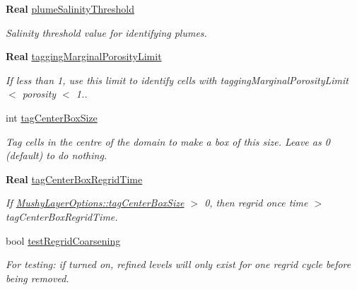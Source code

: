 \begin{DoxyCompactItemize}
\textbf{ Real} \hyperlink{struct_mushy_layer_options_a496277fda822832718ebe3a32479b24b}{plume\+Salinity\+Threshold}
\begin{DoxyCompactList}\small\item\em Salinity threshold value for identifying plumes. \end{DoxyCompactList}\item 
\textbf{ Real} \hyperlink{struct_mushy_layer_options_a940a2f3dfcfa29a2415eb48836369615}{tagging\+Marginal\+Porosity\+Limit}
\begin{DoxyCompactList}\small\item\em If less than 1, use this limit to identify cells with tagging\+Marginal\+Porosity\+Limit $<$ porosity $<$ 1.. \end{DoxyCompactList}\item 
\mbox{\label{struct_mushy_layer_options_a2b049b092633e277924d75e6bac9d9bc}} 
int \hyperlink{struct_mushy_layer_options_a2b049b092633e277924d75e6bac9d9bc}{tag\+Center\+Box\+Size}
\begin{DoxyCompactList}\small\item\em Tag cells in the centre of the domain to make a box of this size. Leave as 0 (default) to do nothing. \end{DoxyCompactList}\item 
\mbox{\label{struct_mushy_layer_options_ad24de8058367b23a9dba3c8c9465f808}} 
\textbf{ Real} \hyperlink{struct_mushy_layer_options_ad24de8058367b23a9dba3c8c9465f808}{tag\+Center\+Box\+Regrid\+Time}
\begin{DoxyCompactList}\small\item\em If \hyperlink{struct_mushy_layer_options_a2b049b092633e277924d75e6bac9d9bc}{Mushy\+Layer\+Options\+::tag\+Center\+Box\+Size} $>$ 0, then regrid once time $>$ tag\+Center\+Box\+Regrid\+Time. \end{DoxyCompactList}\item 
bool \hyperlink{struct_mushy_layer_options_a837666f529c0421b42d23bf175094066}{test\+Regrid\+Coarsening}
\begin{DoxyCompactList}\small\item\em For testing\+: if turned on, refined levels will only exist for one regrid cycle before being removed. \end{DoxyCompactList}\item 
\mbox{\label{struct_mushy_layer_options_aa39139c0c6fe2cbe35efbf1a39ce5348}} 

\end{DoxyCompactItemize}
